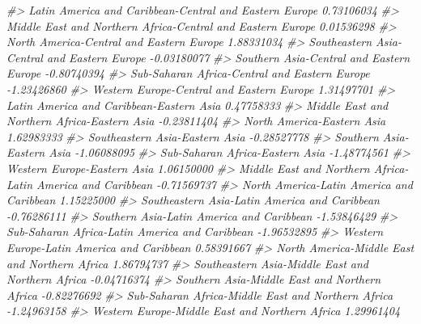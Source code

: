 \documentclass[
]{book}
\newenvironment{Shaded}{\begin{snugshade}}{\end{snugshade}}
\newcommand{\CommentTok}[1]{\textcolor[rgb]{0.56,0.35,0.01}{\textit{#1}}}
\theoremstyle{definition}
\theoremstyle{definition}
\theoremstyle{definition}
\theoremstyle{definition}
\theoremstyle{remark}
\begin{document}
\begin{Shaded}
\begin{Highlighting}[]
\CommentTok{\#\textgreater{} Latin America and Caribbean{-}Central and Eastern Europe       0.73106034}
\CommentTok{\#\textgreater{} Middle East and Northern Africa{-}Central and Eastern Europe   0.01536298}
\CommentTok{\#\textgreater{} North America{-}Central and Eastern Europe                     1.88331034}
\CommentTok{\#\textgreater{} Southeastern Asia{-}Central and Eastern Europe                {-}0.03180077}
\CommentTok{\#\textgreater{} Southern Asia{-}Central and Eastern Europe                    {-}0.80740394}
\CommentTok{\#\textgreater{} Sub{-}Saharan Africa{-}Central and Eastern Europe               {-}1.23426860}
\CommentTok{\#\textgreater{} Western Europe{-}Central and Eastern Europe                    1.31497701}
\CommentTok{\#\textgreater{} Latin America and Caribbean{-}Eastern Asia                     0.47758333}
\CommentTok{\#\textgreater{} Middle East and Northern Africa{-}Eastern Asia                {-}0.23811404}
\CommentTok{\#\textgreater{} North America{-}Eastern Asia                                   1.62983333}
\CommentTok{\#\textgreater{} Southeastern Asia{-}Eastern Asia                              {-}0.28527778}
\CommentTok{\#\textgreater{} Southern Asia{-}Eastern Asia                                  {-}1.06088095}
\CommentTok{\#\textgreater{} Sub{-}Saharan Africa{-}Eastern Asia                             {-}1.48774561}
\CommentTok{\#\textgreater{} Western Europe{-}Eastern Asia                                  1.06150000}
\CommentTok{\#\textgreater{} Middle East and Northern Africa{-}Latin America and Caribbean {-}0.71569737}
\CommentTok{\#\textgreater{} North America{-}Latin America and Caribbean                    1.15225000}
\CommentTok{\#\textgreater{} Southeastern Asia{-}Latin America and Caribbean               {-}0.76286111}
\CommentTok{\#\textgreater{} Southern Asia{-}Latin America and Caribbean                   {-}1.53846429}
\CommentTok{\#\textgreater{} Sub{-}Saharan Africa{-}Latin America and Caribbean              {-}1.96532895}
\CommentTok{\#\textgreater{} Western Europe{-}Latin America and Caribbean                   0.58391667}
\CommentTok{\#\textgreater{} North America{-}Middle East and Northern Africa                1.86794737}
\CommentTok{\#\textgreater{} Southeastern Asia{-}Middle East and Northern Africa           {-}0.04716374}
\CommentTok{\#\textgreater{} Southern Asia{-}Middle East and Northern Africa               {-}0.82276692}
\CommentTok{\#\textgreater{} Sub{-}Saharan Africa{-}Middle East and Northern Africa          {-}1.24963158}
\CommentTok{\#\textgreater{} Western Europe{-}Middle East and Northern Africa               1.29961404}

\end{Highlighting}
\end{Shaded}
\end{document}
